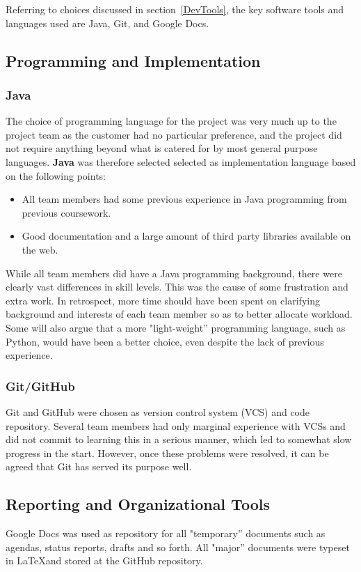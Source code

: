 Referring to choices discussed in section~\ref{DevTools}, the key
software tools and languages used are Java, Git, and Google
Docs. 

\subsection{Programming and Implementation}

\subsubsection{Java}
The choice of programming language for the project was very much up to the
project team as the customer had no particular preference, and the
project did not require anything beyond what is catered for by most
general purpose languages. \textbf{Java} was therefore selected 
selected as implementation language based on the following points:

\begin{itemize}
\item All team members had some previous experience in Java
  programming from previous coursework.
\item Good documentation and a large amount of third party libraries
  available on the web.
\end{itemize}

While all team members did have a Java programming background, there
were clearly vast differences in skill levels. This was the cause of
some frustration and extra work. In retrospect, more time should have been spent
on clarifying background and interests of each team member so as to
better allocate workload. Some will also argue that a more
"light-weight'' programming language, such as Python, would have been a
better choice, even despite the lack of previous experience.

\subsubsection{Git/GitHub}
Git and GitHub were chosen as version control system (VCS) and code
repository. Several team members had only marginal experience with
VCSs and did not commit to learning this in a serious manner, which
led to somewhat slow progress in the start. However, once these problems
were resolved, it can be agreed that Git has served its purpose well.


\subsection{Reporting and Organizational Tools}
Google Docs was used as repository for all "temporary'' documents such
as agendas, status reports, drafts and so forth. All "major''
documents were typeset in \LaTeX and stored at the GitHub repository.

